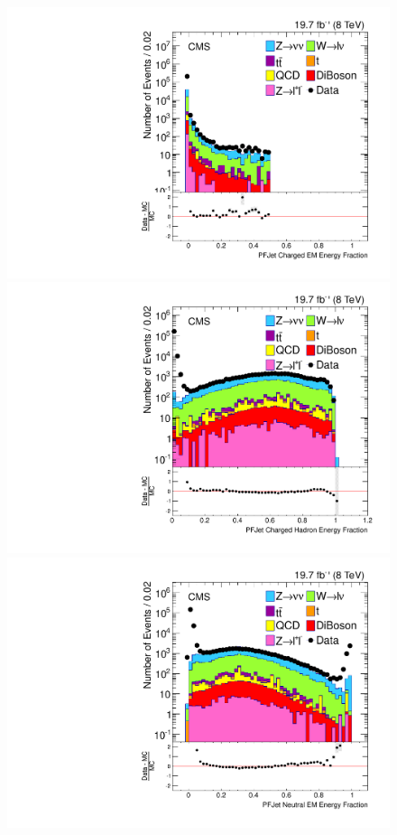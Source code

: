 \begin{figure}[!Hhtb]%
  \begin{center}
  \includegraphics[scale=0.30]     {Figures/sus13009/nocut/PFAK5JetChaEmEngFrac.pdf}
  \includegraphics[scale=0.30]     {Figures/sus13009/nocut/PFAK5JetChaHadEngFrac.pdf}
  \includegraphics[scale=0.30]     {Figures/sus13009/nocut/PFAK5JetNeuEmEngFrac.pdf}

\end{center}
\end{figure}
